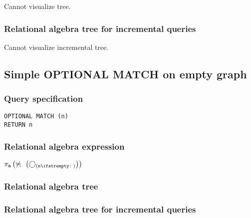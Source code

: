 Cannot visualize tree.

\subsubsection*{Relational algebra tree for incremental queries}

Cannot visualize incremental tree.

\subsection{Simple OPTIONAL MATCH on empty graph}

\subsubsection*{Query specification}

\begin{lstlisting}
OPTIONAL MATCH (n)
RETURN n
\end{lstlisting}

\subsubsection*{Relational algebra expression}

$\projection{\var{n}} \left(\alldifferent{} \left(\getvertices{n}{}\right)\right)$

\subsubsection*{Relational algebra tree}


\subsubsection*{Relational algebra tree for incremental queries}


